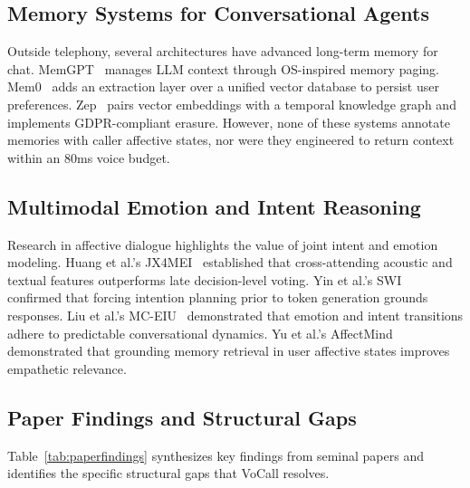 \documentclass[conference]{IEEEtran}
\begin{document}
\subsection{Memory Systems for Conversational Agents}
Outside telephony, several architectures have advanced long-term memory for chat. MemGPT~\cite{memgpt} manages LLM context through OS-inspired memory paging. Mem0~\cite{mem0} adds an extraction layer over a unified vector database to persist user preferences. Zep~\cite{zep} pairs vector embeddings with a temporal knowledge graph and implements GDPR-compliant erasure. However, none of these systems annotate memories with caller affective states, nor were they engineered to return context within an 80ms voice budget.

\subsection{Multimodal Emotion and Intent Reasoning}
Research in affective dialogue highlights the value of joint intent and emotion modeling. Huang et al.'s JX4MEI~\cite{jx4mei} established that cross-attending acoustic and textual features outperforms late decision-level voting. Yin et al.'s SWI~\cite{swi} confirmed that forcing intention planning prior to token generation grounds responses. Liu et al.'s MC-EIU~\cite{mceiu} demonstrated that emotion and intent transitions adhere to predictable conversational dynamics. Yu et al.'s AffectMind~\cite{affectmind} demonstrated that grounding memory retrieval in user affective states improves empathetic relevance.

\subsection{Paper Findings and Structural Gaps}
Table~\ref{tab:paperfindings} synthesizes key findings from seminal papers and identifies the specific structural gaps that VoCall resolves.
\end{document}
